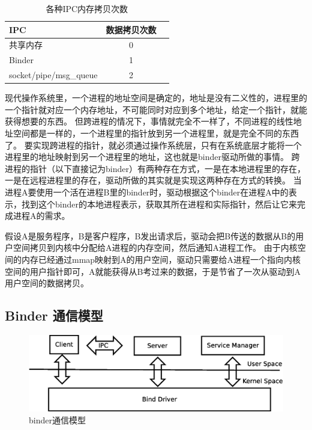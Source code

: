\documentclass[a4paper,11pt]{article}
\begin{document}
\begin{CJK*}{UTF8}{gbsn}
    \begin{table}[htbp]
    \centering
    \caption{\label{tab:test}各种IPC内存拷贝次数}
    \begin{tabular}{lcl}
    \toprule
    IPC & 数据拷贝次数 \\
    \midrule
        共享内存 & 0\\
        Binder & 1 \\
        socket/pipe/msg\_queue & 2\\
    \bottomrule
    \end{tabular}
    \end{table}

    现代操作系统里，一个进程的地址空间是确定的，地址是没有二义性的，进程里的一个指针就对应一个内存地址，不可能同时对应到多个地址，给定一个指针，就能获得想要的东西。
    但跨进程的情况下，事情就完全不一样了，不同进程的线性地址空间都是一样的，一个进程里的指针放到另一个进程里，就是完全不同的东西了。
    要实现跨进程的指针，就必须通过操作系统层，只有在系统底层才能将一个进程里的地址映射到另一个进程里的地址，这也就是binder驱动所做的事情。
    跨进程的指针（以下直接记为binder）有两种存在方式，一是在本地进程里的存在，一是在远程进程里的存在，驱动所做的其实就是实现这两种存在方式的转换。
    当进程A要使用一个活在进程B里的binder时，驱动根据这个binder在进程A中的表示，找到这个binder的本地进程表示，获取其所在进程和实际指针，然后让它来完成进程A的需求。

    假设A是服务程序，B是客户程序，B发出请求后，驱动会把B传送的数据从B的用户空间拷贝到内核中分配给A进程的内存空间，然后通知A进程工作。
    由于内核空间的内存已经通过mmap映射到A的用户空间，驱动只需要给A进程一个指向内核空间的用户指针即可，A就能获得从B考过来的数据，于是节省了一次从驱动到A用户空间的数据拷贝。
    \subsection{Binder 通信模型}
    \begin{figure}[h!]
    \centering
    \includegraphics[keepaspectratio=true, scale=0.4]{dia/binder_model.eps}
    \caption{binder通信模型}
    \end{figure}


\end{CJK*}
\end{document}
